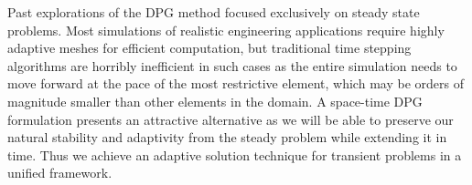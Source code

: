 \documentclass[letterpaper,12pt]{article}
\begin{document}
Past explorations of the DPG method focused exclusively on steady state problems.
Most simulations of realistic engineering applications require highly adaptive meshes for efficient computation,
but traditional time stepping algorithms are horribly inefficient in such cases as the entire simulation needs to move forward 
at the pace of the most restrictive element, which may be orders of magnitude smaller than other elements in the domain.
A space-time DPG formulation presents an attractive alternative as we will be able to preserve our natural stability and adaptivity 
from the steady problem while extending it in time.
Thus we achieve an adaptive solution technique for transient problems in a unified framework.
\end{document}
